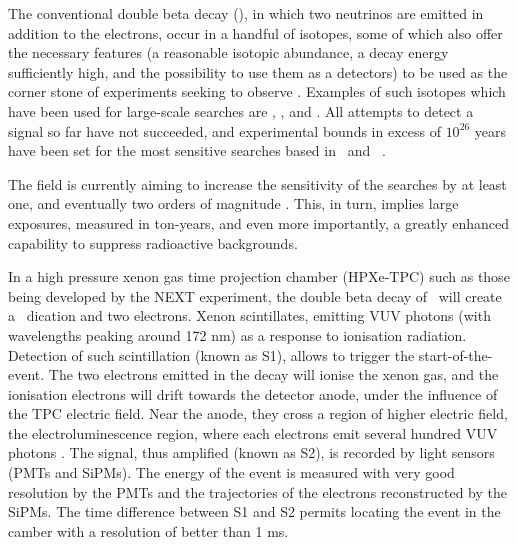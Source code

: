\documentclass[aps,prl,reprint,longbibliography,superscriptaddress, english]{revtex4-1}
\begin{document}
The conventional double beta decay (\bbtnu), in which two neutrinos are emitted in addition to the electrons, occur in a handful of isotopes, some of which also offer the necessary features (a reasonable isotopic abundance, a decay energy sufficiently high, and the possibility to use them as a detectors) to be used as the corner stone of experiments seeking to observe \bbonu. Examples of such isotopes which have been used for large-scale searches are \GE, \TE, and \XE. All attempts to detect a signal so far have not succeeded, and experimental bounds in excess of $10^{26}$ years have been set for the most sensitive searches based in \XE\ and \GE\ \cite{Gando:2016ji, Agostini:2018tnm}.

The field is currently aiming to increase the sensitivity of the searches by at least one, and eventually two orders of magnitude \cite{Gomez-Cadenas:2019sfa}. This, in turn, implies large exposures, measured in ton-years, and even more importantly, a greatly enhanced capability to suppress radioactive backgrounds. 

In a high pressure xenon gas time projection chamber (HPXe-TPC) such as those being developed by the NEXT experiment, the double beta decay of
\XE\ will create a \Bapp\ dication and two electrons. Xenon scintillates, emitting VUV photons (with wavelengths peaking around 172 nm) as a response to ionisation radiation. Detection of such scintillation (known as S1), allows to trigger the start-of-the-event. The two electrons emitted in the decay will ionise the xenon gas, and the ionisation electrons will drift towards the detector anode, under the influence of the TPC electric field. Near the anode, they cross a region of higher electric field, the electroluminescence region, where each electrons emit several hundred VUV photons \cite{Monrabal:2018xlr}. The signal, thus amplified (known as S2), is recorded by light sensors (PMTs and SiPMs). The energy of the event is measured with very good resolution by the PMTs \cite{Renner:2019pfe} and the trajectories of the electrons reconstructed by the SiPMs\cite{Ferrario:2019kwg, NEXT:2020try}. The time difference between S1 and S2 permits locating the event in the camber with a resolution of better than 1 ms. 
\end{document}
